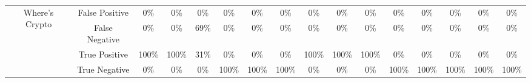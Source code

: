 \begin{table}[htb]
\begin{adjustbox}{max width=\textwidth}
\begin{tabular}{cc|ccccccccc|ccccc}
\multicolumn{1}{c|}{\multirow{4}{*}{Where's Crypto}} & \multicolumn{1}{c||}{False Positive} & \multicolumn{1}{c|}{0\%} & \multicolumn{1}{c|}{0\%} & \multicolumn{1}{c|}{0\%} & \multicolumn{1}{c|}{0\%} & \multicolumn{1}{c|}{0\%} & \multicolumn{1}{c|}{0\%} & \multicolumn{1}{c|}{0\%} & \multicolumn{1}{c|}{0\%} & \multicolumn{1}{c|}{0\%} & \multicolumn{1}{c|}{0\%} & \multicolumn{1}{c|}{0\%} & \multicolumn{1}{c|}{0\%} & \multicolumn{1}{c|}{0\%} & 0\% \\ \cline{2-16} 
\multicolumn{1}{c|}{} & \multicolumn{1}{c||}{False Negative} & \multicolumn{1}{c|}{0\%} & \multicolumn{1}{c|}{0\%} & \multicolumn{1}{c|}{69\%} & \multicolumn{1}{c|}{0\%} & \multicolumn{1}{c|}{0\%} & \multicolumn{1}{c|}{0\%} & \multicolumn{1}{c|}{0\%} & \multicolumn{1}{c|}{0\%} & \multicolumn{1}{c|}{0\%} & \multicolumn{1}{c|}{0\%} & \multicolumn{1}{c|}{0\%} & \multicolumn{1}{c|}{0\%} & \multicolumn{1}{c|}{0\%} & 0\% \\ \cline{2-16} 
\multicolumn{1}{c|}{} & \multicolumn{1}{c||}{True Positive} & \multicolumn{1}{c|}{100\%} & \multicolumn{1}{c|}{100\%} & \multicolumn{1}{c|}{31\%} & \multicolumn{1}{c|}{0\%} & \multicolumn{1}{c|}{0\%} & \multicolumn{1}{c|}{0\%} & \multicolumn{1}{c|}{100\%} & \multicolumn{1}{c|}{100\%} & \multicolumn{1}{c|}{100\%} & \multicolumn{1}{c|}{0\%} & \multicolumn{1}{c|}{0\%} & \multicolumn{1}{c|}{0\%} & \multicolumn{1}{c|}{0\%} & 0\% \\ \cline{2-16} 
\multicolumn{1}{c|}{} & \multicolumn{1}{c||}{True Negative} & \multicolumn{1}{c|}{0\%} & \multicolumn{1}{c|}{0\%} & \multicolumn{1}{c|}{0\%} & \multicolumn{1}{c|}{100\%} & \multicolumn{1}{c|}{100\%} & \multicolumn{1}{c|}{100\%} & \multicolumn{1}{c|}{0\%} & \multicolumn{1}{c|}{0\%} & \multicolumn{1}{c|}{0\%} & \multicolumn{1}{c|}{100\%} & \multicolumn{1}{c|}{100\%} & \multicolumn{1}{c|}{100\%} & \multicolumn{1}{c|}{100\%} & 100\% \\ \hline
\end{tabular}
\end{adjustbox}
\label{tab:cryptobinary-quat}
\end{table}

